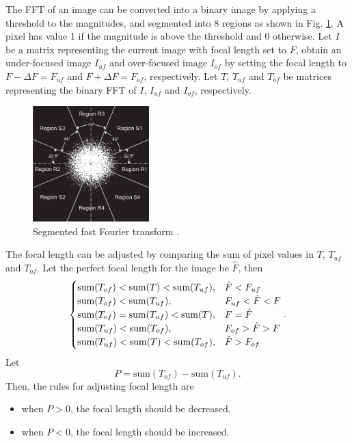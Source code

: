 \documentclass[12pt, conference]{IEEEtran}
\begin{document}
The FFT of an image can be converted into a binary image by applying a threshold to the magnitudes, and segmented into 8 regions as shown in Fig. \ref{FFT regions}. A pixel has value 1 if the magnitude is above the threshold and 0 otherwise. Let $I$ be a matrix representing the current image with focal length set to $F$, obtain an under-focused image $I_{uf}$ and over-focused image $I_{of}$ by setting the focal length to $F-\Delta F=F_{uf}$ and $F+\Delta F=F_{of}$, respectively. Let $T$, $T_{uf}$ and $T_{of}$ be matrices representing the binary FFT of $I$, $I_{uf}$ and $I_{of}$, respectively.

\begin{figure}[htbp]
    \centering
    \includegraphics[width=0.4\textwidth]{Images/FFT regions.jpg}
    \caption{Segmented fast Fourier transform \cite{SEM correction algorithm}.}
    \label{FFT regions}
\end{figure}

The focal length can be adjusted by comparing the sum of pixel values in $T$, $T_{uf}$ and $T_{of}$. Let the perfect focal length for the image be $\hat{F}$, then
\begin{align*}
    \small
\begin{cases}
    \text{sum}(T_{of}) < \text{sum}(T) < \text{sum}(T_{uf}), & \hat{F} < F_{uf} \\
    \text{sum}(T_{of}) < \text{sum}(T_{uf}), & F_{uf} < \hat{F} < F \\
    \text{sum}(T_{of}) = \text{sum}(T_{uf}) < \text{sum}(T), & F = \hat{F} \\
    \text{sum}(T_{uf}) < \text{sum}(T_{of}), & F_{of} > \hat{F} > F \\
    \text{sum}(T_{uf}) < \text{sum}(T) < \text{sum}(T_{of}), & \hat{F} > F_{of}
\end{cases}.
\end{align*}
Let
\begin{equation}
    P = \text{sum}(T_{of}) - \text{sum}(T_{uf}).
\end{equation}
Then, the rules for adjusting focal length are
\begin{itemize}
    \item when $P>0$, the focal length should be decreased.
    \item when $P<0$, the focal length should be increased.
\end{itemize}
\end{document}
